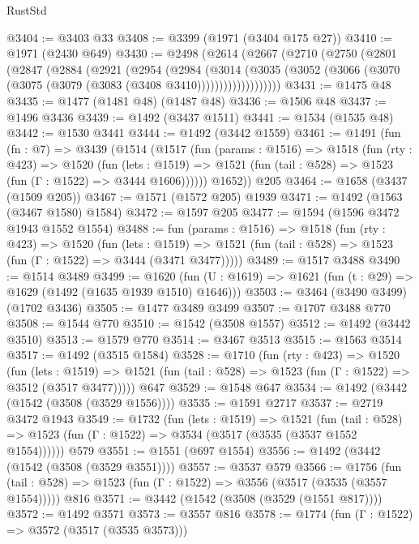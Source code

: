 \begin{lexlean}{RustStd}
\begin{coremodule}
{\begin{coremodule}
{{{{{{{{{{{{{@3404 := @3403 @33
@3408 := @3399 (@1971 (@3404 @175 @27))
@3410 := @1971 (@2430 @649)
@3430 := @2498
    (@2614
      (@2667
        (@2710
          (@2750
            (@2801
              (@2847
                (@2884
                  (@2921
                    (@2954
                      (@2984
                        (@3014
                          (@3035
                            (@3052
                              (@3066 (@3070 (@3075 (@3079 (@3083 (@3408 @3410)))))))))))))))))))
@3431 := @1475 @48
@3435 := @1477 (@1481 @48) (@1487 @48)
@3436 := @1506 @48
@3437 := @1496 @3436
@3439 := @1492 (@3437 @1511)
@3441 := @1534 (@1535 @48)
@3442 := @1530 @3441
@3444 := @1492 (@3442 @1559)
@3461 := @1491
    (fun (fn : @7) =>
    @3439
      (@1514
        (@1517
          (fun (params : @1516) =>
          @1518
            (fun (rty : @423) =>
            @1520
              (fun (lets : @1519) =>
              @1521 (fun (tail : @528) => @1523 (fun (Γ : @1522) => @3444 @1606))))))
        @1652))
    @205
@3464 := @1658 (@3437 (@1509 @205))
@3467 := @1571 (@1572 @205) @1939
@3471 := @1492 (@1563 (@3467 @1580) @1584)
@3472 := @1597 @205
@3477 := @1594 (@1596 @3472 @1943 @1552 @1554)
@3488 := fun (params : @1516) =>
  @1518
    (fun (rty : @423) =>
    @1520
      (fun (lets : @1519) =>
      @1521 (fun (tail : @528) => @1523 (fun (Γ : @1522) => @3444 (@3471 @3477)))))
@3489 := @1517 @3488
@3490 := @1514 @3489
@3499 := @1620 (fun (U : @1619) => @1621 (fun (t : @29) => @1629 (@1492 (@1635 @1939 @1510) @1646)))
@3503 := @3464 (@3490 @3499) (@1702 @3436)
@3505 := @1477 @3489 @3499
@3507 := @1707 @3488 @770
@3508 := @1544 @770
@3510 := @1542 (@3508 @1557)
@3512 := @1492 (@3442 @3510)
@3513 := @1579 @770
@3514 := @3467 @3513
@3515 := @1563 @3514
@3517 := @1492 (@3515 @1584)
@3528 := @1710
    (fun (rty : @423) =>
    @1520
      (fun (lets : @1519) =>
      @1521 (fun (tail : @528) => @1523 (fun (Γ : @1522) => @3512 (@3517 @3477)))))
    @647
@3529 := @1548 @647
@3534 := @1492 (@3442 (@1542 (@3508 (@3529 @1556))))
@3535 := @1591 @2717
@3537 := @2719 @3472 @1943
@3549 := @1732
    (fun (lets : @1519) =>
    @1521
      (fun (tail : @528) => @1523 (fun (Γ : @1522) => @3534 (@3517 (@3535 (@3537 @1552 @1554))))))
    @579
@3551 := @1551 (@697 @1554)
@3556 := @1492 (@3442 (@1542 (@3508 (@3529 @3551))))
@3557 := @3537 @579
@3566 := @1756
    (fun (tail : @528) => @1523 (fun (Γ : @1522) => @3556 (@3517 (@3535 (@3557 @1554)))))
    @816
@3571 := @3442 (@1542 (@3508 (@3529 (@1551 @817))))
@3572 := @1492 @3571
@3573 := @3557 @816
@3578 := @1774 (fun (Γ : @1522) => @3572 (@3517 (@3535 @3573)))
}}}}}}}}}}}}}
\end{coremodule}}
\end{coremodule}
\end{lexlean}
